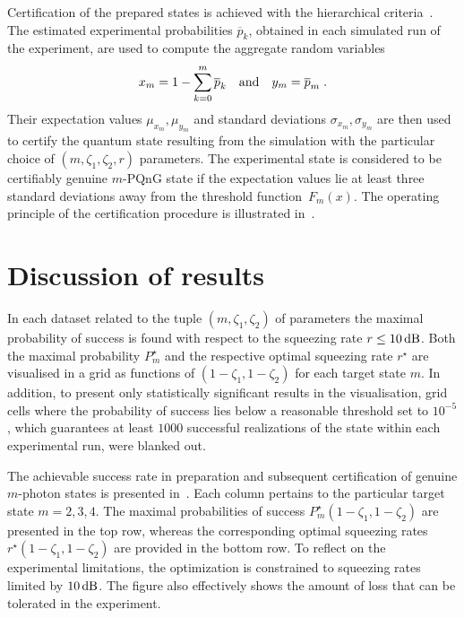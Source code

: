 \documentclass{article}
\begin{document}
Certification of the prepared states is achieved with the hierarchical criteria~\cite{lachman2019}. 
%
The estimated experimental probabilities $\overline{p}_{k}$, obtained in each simulated run of the experiment, are used to compute the aggregate random variables
%
\begin{equation}
  x_{m} = 1 - \sum_{k = 0}^{m} \overline{p}_{k} 
  \quad\text{and}\quad
  y_{m} = \overline{p}_{m} 
  \;\text{.}
\end{equation}
%
Their expectation values $\mu_{x_{m}}, \mu_{y_{m}}$ and standard deviations $\sigma_{x_{m}}, \sigma_{y_{m}}$ are then used to certify the quantum state resulting from the simulation with the particular choice of $(m, \zeta_{1}, \zeta_{2}, r)$ parameters. The experimental state is considered to be certifiably genuine $m$-PQnG state if the expectation values lie at least three standard deviations away from the threshold function~$F_{m} (x)$. The operating principle of the certification procedure is illustrated in~.

%

%
%

\FloatBarrier
\section{Discussion of results}

In each dataset related to the tuple $(m, \zeta_{1}, \zeta_{2})$ of parameters the maximal probability of success is found with respect to the squeezing rate ${r \leq 10\,\mathrm{dB}}$. Both the maximal probability $P_{m}^{\star}$ and the respective optimal squeezing rate ${r^{\star}}$ are visualised in a grid as functions of ${(1 - \zeta_{1}, 1 - \zeta_{2})}$ for each target state $m$. In addition, to present only statistically significant results in the visualisation, grid cells where the probability of success lies below a reasonable threshold set to $10^{-5}$, which guarantees at least $1000$ successful realizations of the state within each experimental run, were blanked out.

The achievable success rate in preparation and subsequent certification of genuine $m$-photon states is presented in~. Each column pertains to the particular target state $m = 2, 3, 4$. The maximal probabilities of success $P_{m}^{\star} (1 - \zeta_{1}, 1 - \zeta_{2})$ are presented in the top row, whereas the corresponding optimal squeezing rates $r^{\star} (1 - \zeta_{1}, 1 - \zeta_{2})$ are provided in the bottom row.
To reflect on the experimental limitations, the optimization is constrained to squeezing rates limited by $10\,\mathrm{dB}$. The figure also effectively shows the amount of loss that can be tolerated in the experiment.
\end{document}

